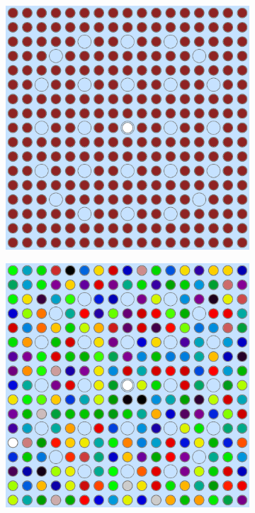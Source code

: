 \begin{figure}[h!]
\centering
\begin{subfigure}{0.45\textwidth}
  \centering
  \includegraphics[width=0.8\linewidth]{figures/assembly/geometry}
  \caption{}
  \label{fig:null-assm}
\end{subfigure}
\begin{subfigure}{0.45\textwidth}
  \centering
  \includegraphics[width=0.8\linewidth]{figures/assembly/degenerate-materials}
  \caption{}
  \label{fig:degenerate-assm}
\end{subfigure}
\begin{subfigure}{0.45\textwidth}

\end{subfigure}
\end{figure}
